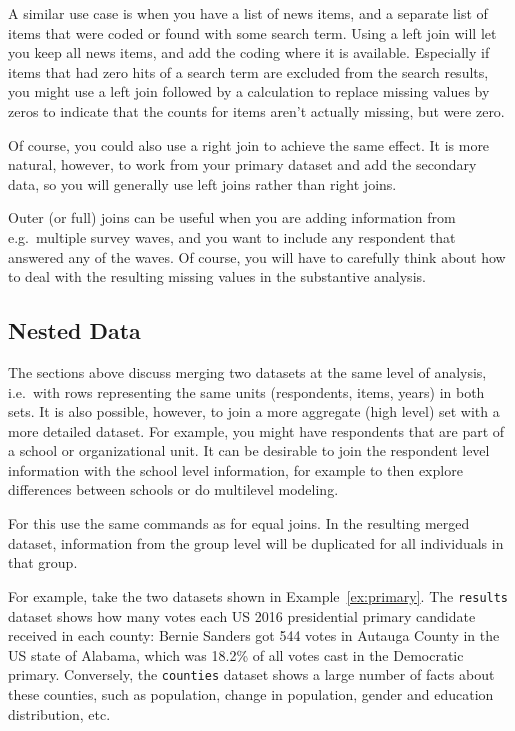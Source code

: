 {A similar use case is when you have a list of news items, and a separate list of items that were coded
or found with some search term. Using a left join will let you keep all news items, and add the coding where it is available.
Especially if items that had zero hits of a search term are excluded from the search results,
you might use a left join followed by a calculation to replace missing values by zeros to indicate that the counts for
items aren't actually missing, but were zero.

Of course, you could also use a right join to achieve the same effect.
It is more natural, however, to work from your primary dataset and add the secondary data,
so you will generally use left joins rather than right joins.

Outer (or full) joins can be useful when you are adding information from e.g.\ multiple survey waves,
and you want to include any respondent that answered any of the waves.
Of course, you will have to carefully think about how to deal with the resulting missing values in the substantive analysis.

\subsection{Nested Data}

The sections above discuss merging two datasets at the same level of analysis,
i.e.\ with rows representing the same units (respondents, items, years) in both sets.
It is also possible, however, to join a more aggregate (high level) set with a more detailed dataset.
For example, you might have respondents that are part of a school or organizational unit.
It can be desirable to join the respondent level information with the school level information,
for example to then explore differences between schools or do multilevel modeling.

For this use the same commands as for equal joins.
In the resulting merged dataset, information from the group level will be duplicated for all individuals in that group.

For example, take the two datasets shown in Example~\ref{ex:primary}.
The \texttt{results} dataset shows how many votes each US 2016 presidential primary candidate received in each county:
Bernie Sanders got 544 votes in Autauga County in the US state of Alabama, which was 18.2\% of all votes cast in the
Democratic primary.
Conversely, the \texttt{counties} dataset shows a large number of facts about these counties,
such as population, change in population, gender and education distribution, etc.

}
